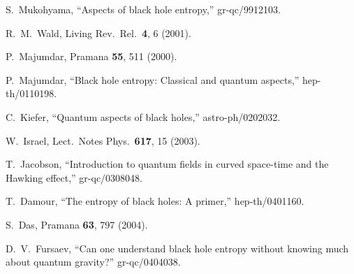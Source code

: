 \documentclass[12pt]{article} \usepackage{latexsym} \textwidth 15cm
\begin{document}
\begin{thebibliography}{99}
 S.~Mukohyama, ``Aspects of black hole entropy,''
  gr-qc/9912103.

 R.~M.~Wald, Living Rev.\ Rel.\  {\bf 4}, 6 (2001).

 P.~Majumdar, Pramana {\bf 55}, 511 (2000).

 P.~Majumdar, ``Black hole entropy: Classical and
  quantum aspects,'' hep-th/0110198.

 C.~Kiefer, ``Quantum aspects of black holes,''
  astro-ph/0202032.

 W.~Israel, Lect.\ Notes Phys.\  {\bf 617}, 15 (2003).

 T.~Jacobson, ``Introduction to quantum fields in
curved space-time and the Hawking effect,'' gr-qc/0308048.

 T.~Damour, ``The entropy of black holes: A primer,''
  hep-th/0401160.

 S.~Das, Pramana {\bf 63}, 797 (2004).

 D.~V.~Fursaev, ``Can one understand black hole
  entropy without knowing much about quantum gravity?'' gr-qc/0404038.

\end{thebibliography}
\end{document}
